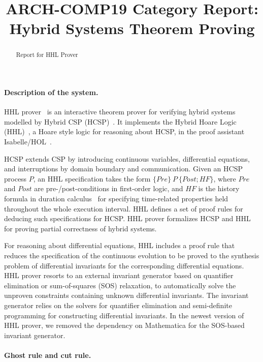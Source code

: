 \documentclass[runningheads,a4paper]{llncs}
\begin{document}
\author{}
\institute{}

\title{ARCH-COMP19 Category Report: Hybrid Systems Theorem Proving}

\maketitle

\begin{abstract}
  Report for HHL Prover
\end{abstract}

\paragraph{Description of the system.}

HHL prover~\cite{WZZ15} is an interactive theorem prover for verifying
hybrid systems modelled by Hybrid CSP (HCSP)~\cite{He94,ZWR96}. It
implements the Hybrid Hoare Logic (HHL)~\cite{LLQZ10}, a Hoare style
logic for reasoning about HCSP, in the proof assistant
Isabelle/HOL~\cite{isabelle}.

HCSP extends CSP by introducing continuous variables, differential
equations, and interruptions by domain boundary and
communication. Given an HCSP process $P$, an HHL specification takes
the form $\{Pre\}~P~\{Post; HF\}$, where $Pre$ and $Post$ are
pre-/post-conditions in first-order logic, and $HF$ is the history
formula in duration calculus~\cite{ZH04} for specifying time-related
properties held throughout the whole execution interval. HHL defines a
set of proof rules for deducing such specifications for HCSP. HHL
prover formalizes HCSP and HHL for proving partial correctness of
hybrid systems.

For reasoning about differential equations, HHL includes a proof rule
that reduces the specification of the continuous evolution to be
proved to the synthesis problem of differential invariants for the
corresponding differential equations. HHL prover resorts to an
external invariant generator based on quantifier elimination or
sum-of-squares (SOS) relaxation, to automatically solve the unproven
constraints containing unknown differential invariants. The invariant
generator relies on the solvers for quantifier elimination and
semi-definite programming for constructing differential invariants. In
the newest version of HHL prover, we removed the dependency on
Mathematica for the SOS-based invariant generator.

\paragraph{Ghost rule and cut rule.}
\end{document}
